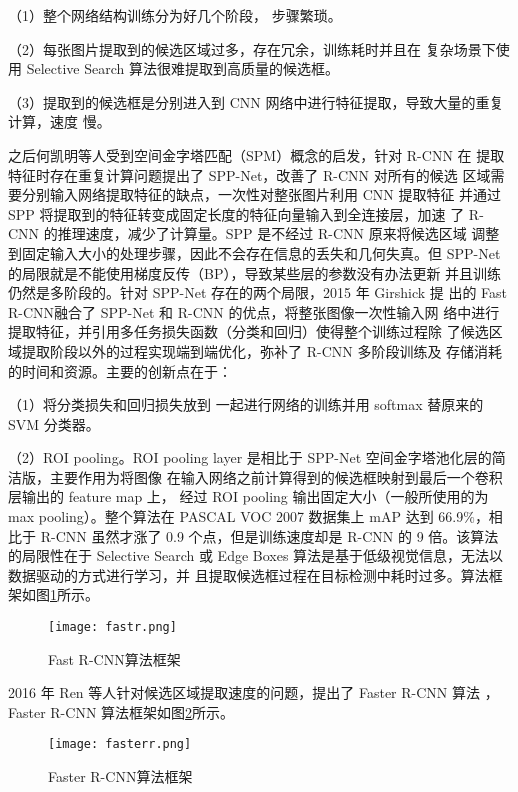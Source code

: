 （1）整个网络结构训练分为好几个阶段，
步骤繁琐。

（2）每张图片提取到的候选区域过多，存在冗余，训练耗时并且在
复杂场景下使用 Selective Search 算法很难提取到高质量的候选框。

（3）提取到的候选框是分别进入到 CNN 网络中进行特征提取，导致大量的重复计算，速度
慢。

之后何凯明等人受到空间金字塔匹配（SPM）概念的启发，针对 R-CNN 在
提取特征时存在重复计算问题提出了 SPP-Net\cite{purkait2017spp}，改善了 R-CNN 对所有的候选
区域需要分别输入网络提取特征的缺点，一次性对整张图片利用 CNN 提取特征
并通过 SPP 将提取到的特征转变成固定长度的特征向量输入到全连接层，加速
了 R-CNN 的推理速度，减少了计算量。SPP 是不经过 R-CNN 原来将候选区域
调整到固定输入大小的处理步骤，因此不会存在信息的丢失和几何失真。但
SPP-Net 的局限就是不能使用梯度反传（BP），导致某些层的参数没有办法更新
并且训练仍然是多阶段的。针对 SPP-Net 存在的两个局限，2015 年 Girshick 提
出的 Fast R-CNN\cite{girshick2015fast}融合了 SPP-Net 和 R-CNN 的优点，将整张图像一次性输入网
络中进行提取特征，并引用多任务损失函数（分类和回归）使得整个训练过程除
了候选区域提取阶段以外的过程实现端到端优化，弥补了 R-CNN 多阶段训练及
存储消耗的时间和资源。主要的创新点在于：

（1）将分类损失和回归损失放到
一起进行网络的训练并用 softmax 替原来的 SVM 分类器。

（2）ROI pooling。ROI
pooling layer 是相比于 SPP-Net 空间金字塔池化层的简洁版，主要作用为将图像
在输入网络之前计算得到的候选框映射到最后一个卷积层输出的 feature map 上，
经过 ROI pooling 输出固定大小（一般所使用的为 max pooling）。整个算法在
PASCAL VOC 2007 数据集上 mAP 达到 66.9$\%$，相比于 R-CNN 虽然才涨了 0.9
个点，但是训练速度却是 R-CNN 的 9 倍。该算法的局限性在于 Selective Search
或 Edge Boxes 算法是基于低级视觉信息，无法以数据驱动的方式进行学习，并
且提取候选框过程在目标检测中耗时过多。算法框架如图\ref{fastr}所示。

\begin{figure}[htbp]
    \centering
    \texttt{[image: fastr.png]}
    \caption{Fast R-CNN算法框架}
    \label{fastr}
\end{figure}

2016 年 Ren 等人针对候选区域提取速度的问题，提出了 Faster R-CNN 算法
\cite{ren2015faster}，Faster R-CNN 算法框架如图\ref{fasterr}所示。

\begin{figure}[htbp]
    \centering
    \texttt{[image: fasterr.png]}
    \caption{Faster R-CNN算法框架}
    \label{fasterr}
\end{figure}


